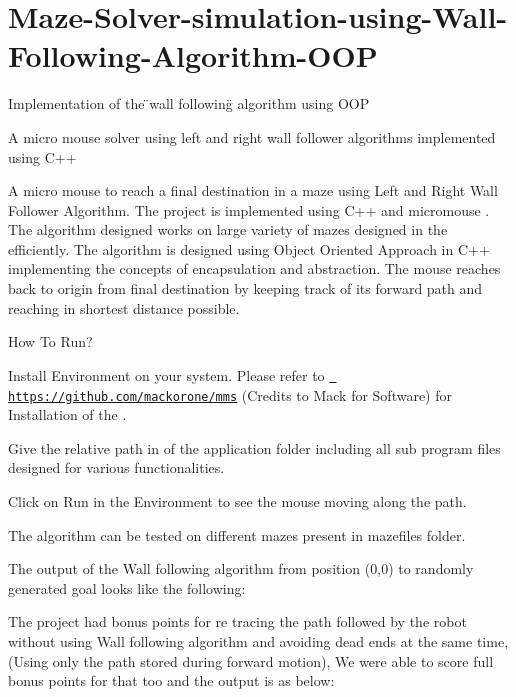 \chapter{Maze-\/\+Solver-\/simulation-\/using-\/\+Wall-\/\+Following-\/\+Algorithm-\/\+OOP}
\hypertarget{md__d_1_2_maze-_solver-simulation-using-_wall-_following-_algorithm-_o_o_p_2_r_e_a_d_m_e}{}\label{md__d_1_2_maze-_solver-simulation-using-_wall-_following-_algorithm-_o_o_p_2_r_e_a_d_m_e}
\label{md__d_1_2_maze-_solver-simulation-using-_wall-_following-_algorithm-_o_o_p_2_r_e_a_d_m_e_autotoc_md5}%
%
Implementation of the \"{}wall following\"{} algorithm using OOP

A micro mouse solver using left and right wall follower algorithms implemented using C++

A micro mouse to reach a final destination in a maze using Left and Right Wall Follower Algorithm. The project is implemented using C++ and micromouse . The algorithm designed works on large variety of mazes designed in the  efficiently. The algorithm is designed using Object Oriented Approach in C++ implementing the concepts of encapsulation and abstraction. The mouse reaches back to origin from final destination by keeping track of its forward path and reaching in shortest distance possible.

How To Run?
\begin{DoxyEnumerate}
\item Install  Environment on your system. Please refer to \href{https://github.com/mackorone/mms}{\texttt{ https\+://github.\+com/mackorone/mms}} (Credits to Mack for  Software) for Installation of the .
\item Give the relative path in  of the application folder including all sub program files designed for various functionalities.
\item Click on Run in the  Environment to see the mouse moving along the path.
\item The algorithm can be tested on different mazes present in mazefiles folder.
\end{DoxyEnumerate}

The output of the Wall following algorithm from position (0,0) to randomly generated goal looks like the following\+:



The project had bonus points for re tracing the path followed by the robot without using Wall following algorithm and avoiding dead ends at the same time, (Using only the path stored during forward motion), We were able to score full bonus points for that too and the output is as below\+:

 